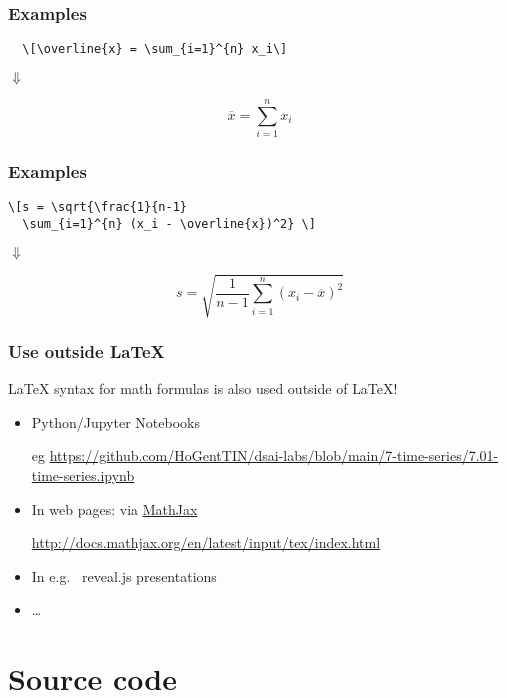 \documentclass[aspectratio=169]{beamer}
\begin{document}
\begin{frame}[fragile]
  \frametitle{Examples}

\begin{verbatim}
  \[\overline{x} = \sum_{i=1}^{n} x_i\]
\end{verbatim}

  \bigskip

  \centering
  $\Downarrow$

  \bigskip

  \[\overline{x} = \sum_{i=1}^{n} x_i\]

\end{frame}

\begin{frame}[fragile]
  \frametitle{Examples}

\begin{verbatim}
\[s = \sqrt{\frac{1}{n-1} 
  \sum_{i=1}^{n} (x_i - \overline{x})^2} \]
\end{verbatim}

  \bigskip

  \centering
  $\Downarrow$

  \bigskip

  \[s = \sqrt{\frac{1}{n-1} \sum_{i=1}^{n} (x_i - \overline{x})^2} \]

\end{frame}

\begin{frame}
  \frametitle{Use outside {\LaTeX}}

{\LaTeX} syntax for math formulas is also used outside of {\LaTeX}!

  \begin{itemize}
   \item Python/Jupyter Notebooks
   
   eg \url{https://github.com/HoGentTIN/dsai-labs/blob/main/7-time-series/7.01-time-series.ipynb}
   
   \item In web pages: via \href{https://www.mathjax.org}{MathJax}
   
   \url{http://docs.mathjax.org/en/latest/input/tex/index.html}
   
   \item In e.g. ~reveal.js presentations
    \item \ldots
  \end{itemize}

\end{frame}

\section{Source code}
\end{document}
